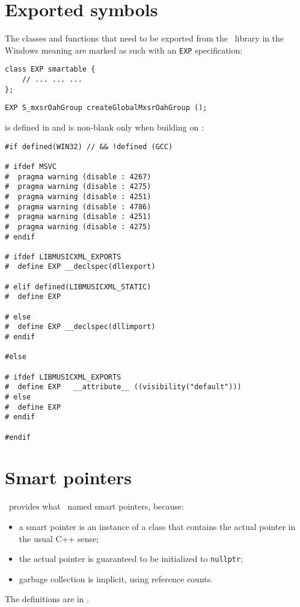 \section{Exported symbols}

The classes and functions that need to be exported from the \mf\ library in the Windows meaning are marked as such with an {\tt EXP} specification:
\begin{lstlisting}[language=CPlusPlus]
class EXP smartable {
	// ... ... ...
};
\end{lstlisting}

\begin{lstlisting}[language=CPlusPlus]
EXP S_mxsrOahGroup createGlobalMxsrOahGroup ();
\end{lstlisting}

 is defined in  and is non-blank only when building on \Windows:
\begin{lstlisting}[language=CPlusPlus]
#if defined(WIN32) // && !defined (GCC)

# ifdef MSVC
#  pragma warning (disable : 4267)
#  pragma warning (disable : 4275)
#  pragma warning (disable : 4251)
#  pragma warning (disable : 4786)
#  pragma warning (disable : 4251)
#  pragma warning (disable : 4275)
# endif

# ifdef LIBMUSICXML_EXPORTS
#  define EXP __declspec(dllexport)

# elif defined(LIBMUSICXML_STATIC)
#  define EXP

# else
#  define EXP __declspec(dllimport)
# endif

#else

# ifdef LIBMUSICXML_EXPORTS
#  define EXP	__attribute__ ((visibility("default")))
# else
#  define EXP
# endif

#endif
\end{lstlisting}


\section{Smart pointers}

\libmusicxml\ provides what \fober\ named smart pointers, because:
\begin{itemize}
\item a smart pointer is an instance of a class   that contains the actual pointer in the usual C++ sense;
\item the actual pointer is guaranteed to be initialized to {\tt nullptr};
\item garbage collection is implicit, using reference counts.
\end{itemize}
The definitions are in .

